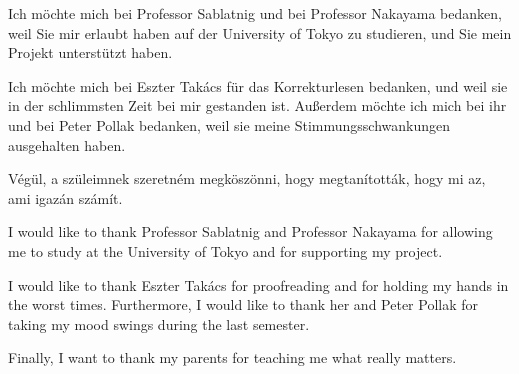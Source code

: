 \documentclass[draft,final]{vutinfth} %
\begin{document}
\frontmatter %

\addstatementpage

\begin{danksagung*}
\par
Ich möchte mich bei Professor Sablatnig und bei Professor Nakayama bedanken, weil Sie mir erlaubt haben auf der University of Tokyo zu studieren, und Sie mein Projekt unterstützt haben.
\par
Ich möchte mich bei Eszter Takács für das Korrekturlesen bedanken, und weil sie in der schlimmsten Zeit bei mir gestanden ist.
Außerdem möchte ich mich bei ihr und bei Peter Pollak bedanken, weil sie meine Stimmungsschwankungen ausgehalten haben.
\par
Végül, a szüleimnek szeretném megköszönni, hogy megtanították, hogy mi az, ami igazán számít.
\end{danksagung*}

\begin{acknowledgements*}
\par
I would like to thank Professor Sablatnig and Professor  Nakayama for allowing me to study at the University of Tokyo and for supporting my project.
\par
I would like to thank Eszter Takács for proofreading and for holding my hands in the worst times.
Furthermore, I would like to thank her and Peter Pollak for taking my mood swings during the last semester.
\par
Finally, I want to thank my parents for teaching me what really matters.
\end{acknowledgements*}
\end{document}
